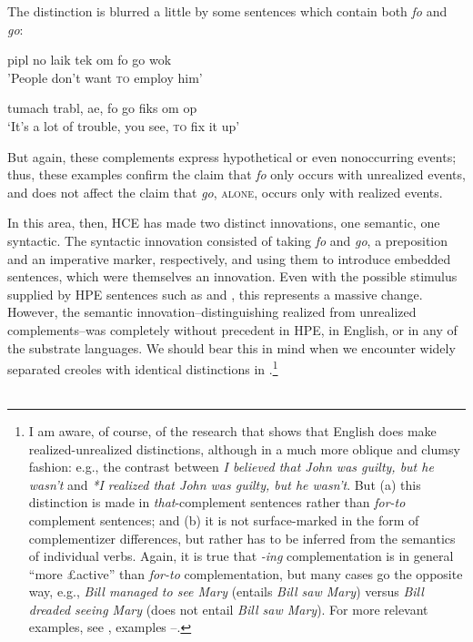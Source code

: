 The distinction is blurred a little by some sentences which contain both \textit{fo} and \textit{go}:

\ea\label{ex:67}
 pipl no laik tek om fo go wok\\
\glt  'People don't want \textsc{to} employ him'
\z

\ea\label{ex:68}
 tumach trabl, ae, fo go fiks om op \\
\glt  `It's a lot of trouble, you see, \textsc{to} fix it up'
\z

\noindent But again, these complements express hypothetical or even nonoccur\-ring events; thus, these examples confirm the claim that \textit{fo} only occurs with unrealized events, and does not affect the claim that \textit{go}, \textsc{alone}, occurs only with realized events.

In this area, then, HCE has made two distinct innovations, one semantic, one syntactic. The syntactic innovation consisted of taking \textit{fo} and \textit{go}, a preposition and an imperative marker, respectively, and using them to introduce embedded sentences, which were themselves an innovation. Even with the possible stimulus supplied by HPE sen\-tences such as  and , this represents a massive change. However, the semantic innovation--distinguishing realized from unrealized com\-plements--was completely without precedent in HPE, in English, or in any of the substrate languages. We should bear this in mind when we encounter widely separated creoles with identical distinctions in .\footnote{I am aware, of course, of the research that shows that English does make realized-unrealized distinctions, although in a much more oblique and clumsy fashion: e.g., the contrast between \textit{I believed that John was guilty, but he wasn't} and \textit{*I realized that John was guilty,  but he wasn't}. But (a) this distinction is made in \textit{that}-complement sentences rather than \textit{for-to} complement sentences; and (b) it is not surface-marked in the form of complementizer differences, but rather has to be inferred from the semantics of individual verbs. Again, it is true that \textit{-ing} complementation is in general ``more £active'' than \textit{for-to} complementation, but many cases go the opposite way, e.g., \textit{Bill managed to see Mary} (entails \textit{Bill saw Mary}) versus \textit{Bill dreaded seeing Mary} (does not entail \textit{Bill saw Mary}). For more relevant exam\-ples, see , examples --.}\\\\

